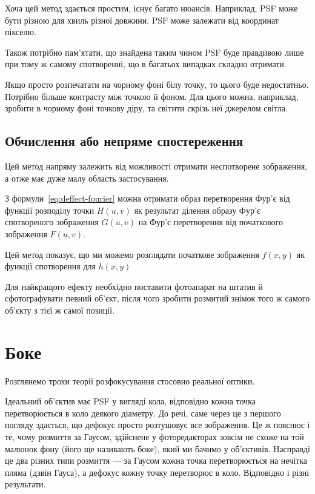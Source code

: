 \documentclass{diploma}
\begin{document}
      Хоча цей метод здається простим, існує багато нюансів.
      Наприклад, PSF може бути різною для хвиль різної довжини.
      PSF може залежати від координат пікселю.

      Також потрібно пам’ятати, що знайдена таким чином PSF буде правдивою
      лише при тому ж самому спотворенні, що в багатьох випадках складно
      отримати.

      Якщо просто розпечатати на чорному фоні білу точку, то цього буде
      недостатньо.
      Потрібно більше контрасту між точкою й фоном.
      Для цього можна, наприклад, зробити в чорному фоні точкову діру, та
      світити скрізь неї джерелом світла.
      \clearpage
    \subsection{Обчислення або непряме спостереження}
      Цей метод напряму залежить від можливості отримати неспотворене
      зображення, а отже має дуже малу область застосування.

      З формули~\eqref{eq:deffect-fourier} можна отримати образ перетворення
      Фур’є від функції розподілу точки $H\left( u, v \right)$ як результат
      ділення образу Фур’є спотвореного зображення $G\left( u, v \right)$ на
      Фур’є перетворення від початкового зображення $F\left( u, v \right)$.

      Цей метод показує, що ми можемо розглядати початкове зображення $f\left(
      x, y \right)$ як функції спотворення для $h\left( x, y \right)$

      Для найкращого ефекту необхідно поставити фотоапарат на штатив й
      сфотографувати певний об’єкт, після чого зробити розмитий знімок того ж
      самого об’єкту з тієї ж самої позиції.
      \clearpage
  \section{Боке}
    Розглянемо трохи теорії розфокусування стосовно реальної оптики.

    Ідеальний об’єктив має PSF у вигляді кола, відповідно кожна точка
    перетворюється в коло деякого діаметру.
    До речі, саме через це з першого погляду здається, що дефокус просто
    розтушовує все зображення.
    Це ж пояснює і те, чому розмиття за Гаусом, здійснене у фоторедакторах
    зовсім не схоже на той малюнок фону (його ще називають боке), який
    ми бачимо у об’єктивів.
    Насправді це два різних типи розмиття --- за Гаусом кожна точка
    перетворюється на нечітка пляма (дзвін Гауса), а дефокус кожну точку
    перетворює в коло.
    Відповідно і різні результати.
\end{document}

